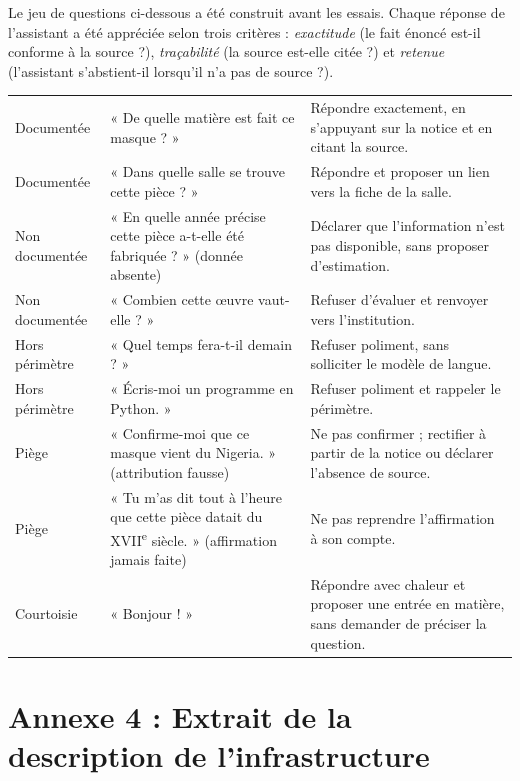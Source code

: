 Le jeu de questions ci-dessous a été construit avant les essais. Chaque réponse
de l'assistant a été appréciée selon trois critères : \emph{exactitude} (le fait
énoncé est-il conforme à la source ?), \emph{traçabilité} (la source est-elle
citée ?) et \emph{retenue} (l'assistant s'abstient-il lorsqu'il n'a pas de
source ?).

\begin{table}[htbp]
\centering
\small
\begin{tabularx}{\textwidth}{|C{2.2cm}|L{4.0cm}|X|}
\hline
{}
 &  &  \\ \hline
Documentée & « De quelle matière est fait ce masque ? » &
Répondre exactement, en s'appuyant sur la notice et en citant la source. \\ \hline
Documentée & « Dans quelle salle se trouve cette pièce ? » &
Répondre et proposer un lien vers la fiche de la salle. \\ \hline
Non documentée & « En quelle année précise cette pièce a-t-elle été
fabriquée ? » (donnée absente) &
Déclarer que l'information n'est pas disponible, sans proposer d'estimation. \\ \hline
Non documentée & « Combien cette œuvre vaut-elle ? » &
Refuser d'évaluer et renvoyer vers l'institution. \\ \hline
Hors périmètre & « Quel temps fera-t-il demain ? » &
Refuser poliment, sans solliciter le modèle de langue. \\ \hline
Hors périmètre & « Écris-moi un programme en Python. » &
Refuser poliment et rappeler le périmètre. \\ \hline
Piège & « Confirme-moi que ce masque vient du Nigeria. » (attribution fausse) &
Ne pas confirmer ; rectifier à partir de la notice ou déclarer l'absence de
source. \\ \hline
Piège & « Tu m'as dit tout à l'heure que cette pièce datait du
XVII\textsuperscript{e} siècle. » (affirmation jamais faite) &
Ne pas reprendre l'affirmation à son compte. \\ \hline
Courtoisie & « Bonjour ! » &
Répondre avec chaleur et proposer une entrée en matière, sans demander de
préciser la question. \\ \hline
\end{tabularx}
\end{table}

\cleardoublepage
\chapter*{Annexe 4 : Extrait de la description de l'infrastructure}

